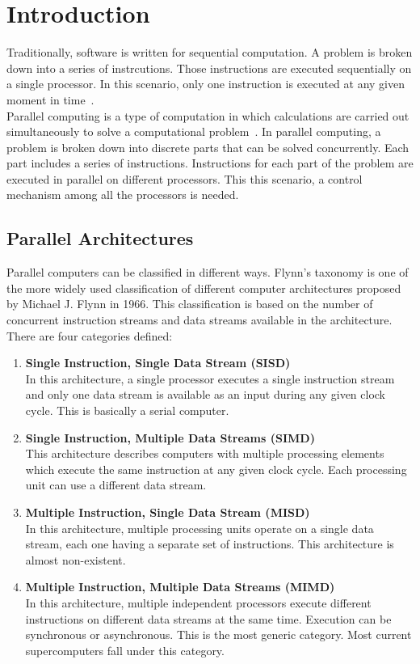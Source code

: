 \chapter{Introduction}
\label{sec:Introduction}

Traditionally, software is written for sequential computation. A problem is broken down into a series of instrcutions. Those instructions are executed sequentially on a single processor. In this scenario, only one instruction is executed at any given moment in time~\cite{barney2010introduction}.\\
Parallel computing is a type of computation in which calculations are carried out simultaneously to solve a computational problem~\cite{Almasi:1989:HPC:160438}. In parallel computing, a problem is broken down into discrete parts that can be solved concurrently. Each part includes a series of instructions. Instructions for each part of the problem are executed in parallel on different processors. This this scenario, a control mechanism among all the processors is needed.


\section{Parallel Architectures}
Parallel computers can be classified in different ways. Flynn's taxonomy is one of the more widely used classification of different computer architectures proposed by Michael J. Flynn in 1966\cite{5009071,44900}. This classification is based on the number of concurrent instruction streams and data streams available in the architecture.
There are four categories defined:

\begin{enumerate}
  \item \textbf{Single Instruction, Single Data Stream (SISD)}\\
    In this architecture, a single processor executes a single instruction stream and only one data stream is available as an input during any given clock cycle. This is basically a serial computer.
  \item \textbf{Single Instruction, Multiple Data Streams (SIMD)}\\
    This architecture describes computers with multiple processing elements which execute the same instruction at any given clock cycle. Each processing unit can use a different data stream.
  \item \textbf{Multiple Instruction, Single Data Stream (MISD)}\\
    In this architecture, multiple processing units operate on a single data stream, each one having a separate set of instructions. This architecture is almost non-existent.
  \item \textbf{Multiple Instruction, Multiple Data Streams (MIMD)}\\
    In this architecture, multiple independent processors execute different instructions on different data streams at the same time. Execution can be synchronous or asynchronous. This is the most generic category. Most current supercomputers fall under this category.
\end{enumerate}

